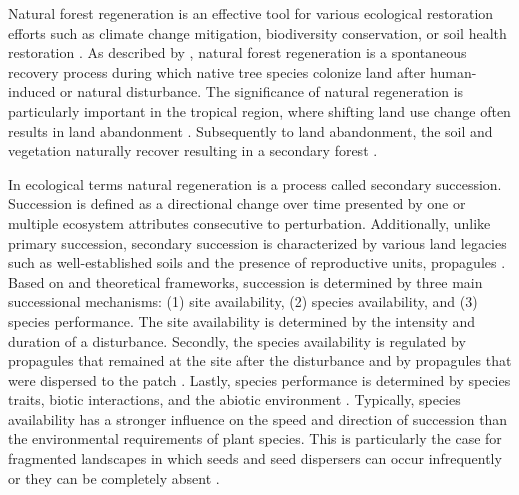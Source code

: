 Natural forest regeneration is an effective tool for various ecological restoration efforts such as climate change mitigation, biodiversity conservation, or soil health restoration \citep{hordijkLandUseHistory2024}. %
As described by \citet{crouzeillesEcologicalRestorationSuccess2017}, natural forest regeneration is a spontaneous recovery process during which native tree species colonize land after human-induced or natural disturbance.
The significance of natural regeneration is particularly important in the tropical region, where shifting land use change often results in land abandonment \citep{chazdonSecondGrowthPromise2014}. %
Subsequently to land abandonment, the soil and vegetation naturally recover resulting in a secondary forest \citep{hordijkLandUseHistory2024}. %

In ecological terms natural regeneration is a process called secondary succession. Succession is defined as a directional change over time presented by one or multiple ecosystem attributes consecutive to perturbation. Additionally, unlike primary succession, secondary succession is characterized by various land legacies such as well-established soils and the presence of reproductive units, propagules \citep{poorterSuccessionalTheories2023}. %
Based on \citet{pickettHierarchicalConsiderationCauses1987} and \citet{poorterComprehensiveFrameworkVegetation2024} theoretical frameworks, succession is determined by three main successional mechanisms: (1) site availability, (2) species availability, and (3) species performance. The site availability is determined by the intensity and duration of a disturbance. Secondly, the species availability is regulated by propagules that remained at the site after the disturbance and by propagules that were dispersed to the patch \citet{gleasonIndividualisticConceptPlant1926, dentUnitingNicheDifferentiation2021}. Lastly, species performance is determined by species traits, biotic interactions, and the abiotic environment \cite{poorterComprehensiveFrameworkVegetation2024}. Typically, species availability has a stronger influence on the speed and direction of succession than the environmental requirements of plant species. This is particularly the case for fragmented landscapes in which seeds and seed dispersers can occur infrequently or they can be completely absent \citep{poorterSuccessionalTheories2023, dentUnitingNicheDifferentiation2021}. 

